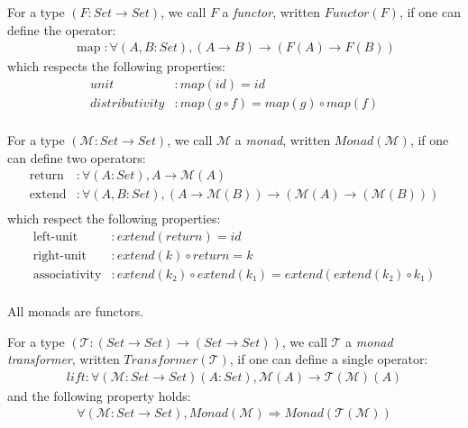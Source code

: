\documentclass{article}
\begin{document}
\begin{definition}
For a type $(F : Set → Set)$, we call $F$ a \emph{functor}, written $Functor(F)$, if one can define the operator:
\begin{align*}
\operatorname{map} : ∀ (A , B : Set), (A → B) → (F(A) → F(B))
\end{align*}
which respects the following properties:
\begin{align*}
          unit &: map(id) = id                  \\
distributivity &: map(g ∘ f) = map(g) ∘ map(f)  \\
\end{align*}
\end{definition}

\begin{definition}
For a type $(ℳ  : Set → Set)$, we call $ℳ $ a \emph{monad}, written $Monad(ℳ )$, if one can define two operators:
\begin{align*}
\operatorname{return} &: ∀ (A : Set), A → ℳ (A)                          \\
\operatorname{extend} &: ∀ (A, B : Set), (A → ℳ (B)) → (ℳ (A) → (ℳ (B))) \\
\end{align*}
which respect the following properties:
\begin{align*}
    \operatorname{left-unit} &: extend(return) = id                               \\
   \operatorname{right-unit} &: extend(k) ∘ return = k                            \\
\operatorname{associativity} &: extend(k₂) ∘ extend(k₁) = extend(extend(k₂) ∘ k₁) \\
\end{align*}
\end{definition}

\begin{corrolary}
All monads are functors.
\end{corrolary}

\begin{definition}
For a type $(𝒯 : (Set → Set) → (Set → Set))$, we call $𝒯$ a \emph{monad transformer}, written $Transformer(𝒯)$, if one can define a single operator:
\begin{align*}
lift : ∀ (ℳ  : Set → Set) (A : Set), ℳ (A) → 𝒯(ℳ )(A)
\end{align*}
and the following property holds:
\begin{align*}
∀ (ℳ  : Set → Set), Monad(ℳ ) ⇒  Monad(𝒯(ℳ ))
\end{align*}
\end{definition}
\end{document}
